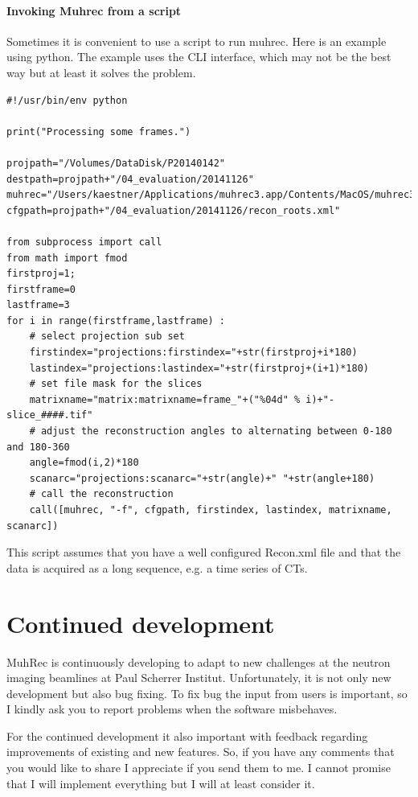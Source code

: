 \documentclass[a4paper]{scrreprt}
\begin{document}
\subsubsection{Invoking Muhrec from a script}
Sometimes it is convenient to use a script to run muhrec. Here is an example using python. The example uses the CLI interface, which may not be the best way but at least it solves the problem.
\begin{verbatim}
#!/usr/bin/env python

print("Processing some frames.")

projpath="/Volumes/DataDisk/P20140142"
destpath=projpath+"/04_evaluation/20141126"
muhrec="/Users/kaestner/Applications/muhrec3.app/Contents/MacOS/muhrec3"
cfgpath=projpath+"/04_evaluation/20141126/recon_roots.xml"

from subprocess import call
from math import fmod
firstproj=1;
firstframe=0
lastframe=3
for i in range(firstframe,lastframe) :
	# select projection sub set
	firstindex="projections:firstindex="+str(firstproj+i*180)
	lastindex="projections:lastindex="+str(firstproj+(i+1)*180)
	# set file mask for the slices
	matrixname="matrix:matrixname=frame_"+("%04d" % i)+"-slice_####.tif"
	# adjust the reconstruction angles to alternating between 0-180 and 180-360
	angle=fmod(i,2)*180 
	scanarc="projections:scanarc="+str(angle)+" "+str(angle+180)
	# call the reconstruction
	call([muhrec, "-f", cfgpath, firstindex, lastindex, matrixname, scanarc])
\end{verbatim}

This script assumes that you have a well configured Recon.xml file and that the data is acquired as a long sequence, e.g. a time series of CTs.

\chapter{Continued development}
MuhRec is continuously developing to adapt to new challenges at the neutron imaging beamlines at Paul Scherrer Institut. Unfortunately, it is not only new development but also bug fixing. To fix bug the input from users is important, so I kindly ask you to report problems when the software misbehaves.

For the continued development it also important with feedback regarding improvements of existing and new features. So, if you have any comments that you would like to share I appreciate if you send them to me. I cannot promise that I will implement everything but I will at least consider it.
\end{document}
